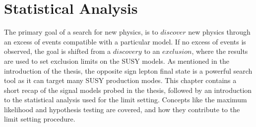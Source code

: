 \chapter{Statistical Analysis}\label{sec:stats}
\noindent\justify
The primary goal of a search for new physics, is to $discover$ new physics through an excess of events compatible with a particular model. 
If no excess of events is observed, the goal is shifted from a $discovery$ to an $exclusion$, where the results are used to set exclusion limits on the SUSY models.
As mentioned in the introduction of the thesis, the opposite sign lepton final state is a powerful search tool as it can target many SUSY production modes. 
\newpara
\noindent\justify
This chapter contains a short recap of the signal models probed in the thesis, followed by an introduction to the statistical analysis used for the limit setting. 
Concepts like the maximum likelihood and hypothesis testing are covered, and how they contribute to the limit setting procedure.
\newpage
